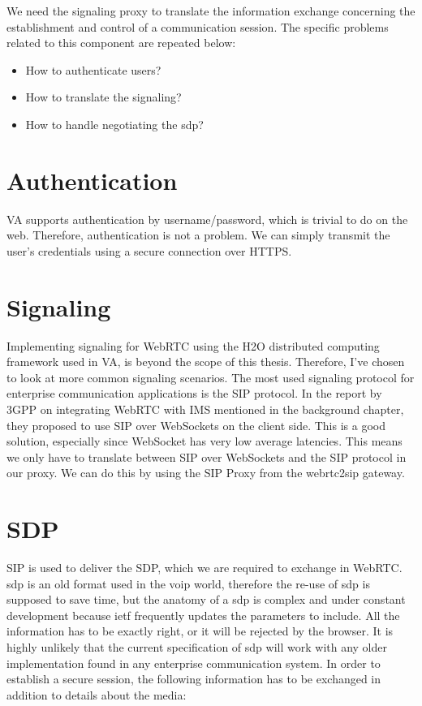 We need the signaling proxy to translate the information exchange concerning the establishment and control of a communication session. The specific problems related to this component are repeated below:

\begin{itemize}
\item{How to authenticate users?}
\item{How to translate the signaling?}
\item{How to handle negotiating the \gls{sdp}?}
\end{itemize}

\section{Authentication}
VA supports authentication by username/password, which is trivial to do on the web. Therefore, authentication is not a problem. We can simply transmit the user's credentials using a secure connection over HTTPS.

\section{Signaling}
Implementing signaling for WebRTC using the H2O distributed computing framework used in VA, is beyond the scope of this thesis. Therefore, I've chosen to look at more common signaling scenarios. The most used signaling protocol for enterprise communication applications is the SIP protocol. In the report by 3GPP\cite{3gpp-wrtc-access-ims} on integrating WebRTC with IMS mentioned in the background chapter, they proposed to use SIP over WebSockets on the client side. This is a good solution, especially since WebSocket has very low average latencies\cite{websocket-overhead}. This means we only have to translate between SIP over WebSockets and the SIP protocol in our proxy. We can do this by using the SIP Proxy from the webrtc2sip gateway.

\section{SDP}
SIP is used to deliver the SDP, which we are required to exchange in WebRTC. \gls{sdp} is an old format used in the \gls{voip} world, therefore the re-use of \gls{sdp} is supposed to save time, but the anatomy of a \gls{sdp} is complex and under constant development because \gls{ietf} frequently updates the parameters to include. All the information has to be exactly right, or it will be rejected by the browser. It is highly unlikely that the current specification of \gls{sdp} will work with any older implementation found in any enterprise communication system. In order to establish a secure session, the following information has to be exchanged in addition to details about the media:


